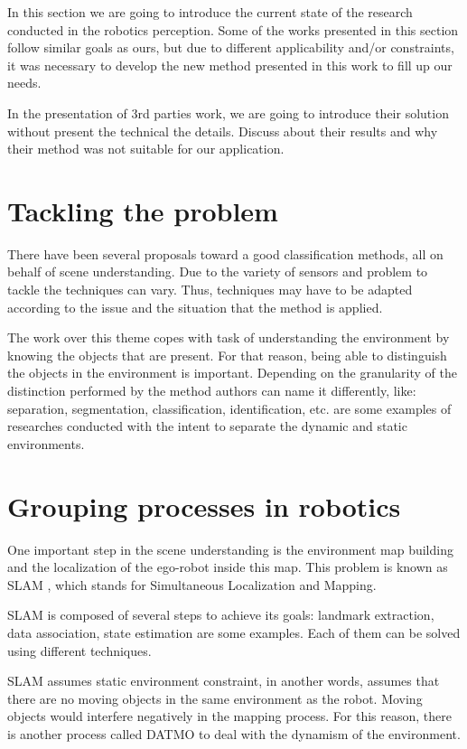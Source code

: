 
In this section we are going to introduce the current state of the research conducted in the robotics perception. Some of the works presented in this section follow similar goals as ours, but due to different applicability and/or constraints, it was necessary to develop the new method presented in this work to fill up our needs.

In the presentation of 3rd parties work, we are going to introduce their solution without present the technical the details. Discuss about their results and why their method was not suitable for our application.

\section{Tackling the problem}

There have been several proposals toward a good classification methods, all on behalf of scene understanding. Due to the variety of sensors and problem to tackle the techniques can vary. Thus, techniques may have to be adapted according to the issue and the situation that the method is applied.

The work over this theme copes with task of understanding the environment by knowing the objects that are present. For that reason, being able to distinguish the objects in the environment is important. Depending on the granularity of the distinction performed by the method authors can name it differently, like: separation, segmentation, classification, identification, etc. \cite{Wolf04onlinesimultaneous} \cite{DBLP:conf/iros/LidorisWB08} are some examples of researches conducted with the intent to separate the dynamic and static environments.

\section{Grouping processes in robotics}

One important step in the scene understanding is the environment map building and the localization of the ego-robot inside this map. This problem is known as SLAM \cite{Leonard2002Mobile} \cite{qadeerthesis}, which stands for Simultaneous Localization and  Mapping.

SLAM is composed of several steps to achieve its goals: landmark extraction, data association, state estimation are some examples. Each of them can be solved using different techniques.

SLAM assumes static environment constraint, in another words, assumes that there are no moving objects in the same environment as the robot. Moving objects would interfere negatively in the mapping process. For this reason, there is another process called DATMO to deal with the dynamism of the environment.


